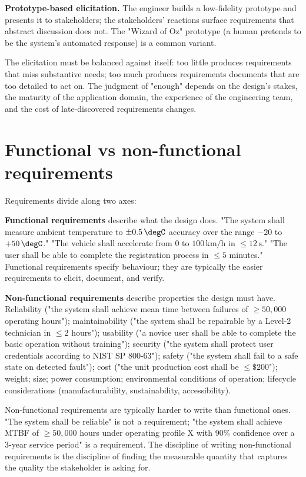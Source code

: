 \textbf{Prototype-based elicitation.} The engineer builds a low-fidelity prototype and presents it to stakeholders; the stakeholders' reactions surface requirements that abstract discussion does not. The "Wizard of Oz" prototype (a human pretends to be the system's automated response) is a common variant.

The elicitation must be balanced against itself: too little produces requirements that miss substantive needs; too much produces requirements documents that are too detailed to act on. The judgment of "enough" depends on the design's stakes, the maturity of the application domain, the experience of the engineering team, and the cost of late-discovered requirements changes.

\section{Functional vs non-functional requirements}

Requirements divide along two axes:

\textbf{Functional requirements} describe what the design does. "The system shall measure ambient temperature to $\pm 0.5\,\degC$ accuracy over the range $-20$ to $+50\,\degC$." "The vehicle shall accelerate from 0 to $100\,\text{km/h}$ in $\leq 12\,\text{s}$." "The user shall be able to complete the registration process in $\leq 5$ minutes." Functional requirements specify behaviour; they are typically the easier requirements to elicit, document, and verify.

\textbf{Non-functional requirements} describe properties the design must have. Reliability ("the system shall achieve mean time between failures of $\geq 50{,}000$ operating hours"); maintainability ("the system shall be repairable by a Level-2 technician in $\leq 2$ hours"); usability ("a novice user shall be able to complete the basic operation without training"); security ("the system shall protect user credentials according to NIST SP 800-63"); safety ("the system shall fail to a safe state on detected fault"); cost ("the unit production cost shall be $\leq \$200$"); weight; size; power consumption; environmental conditions of operation; lifecycle considerations (manufacturability, sustainability, accessibility).

Non-functional requirements are typically harder to write than functional ones. "The system shall be reliable" is not a requirement; "the system shall achieve MTBF of $\geq 50{,}000$ hours under operating profile X with 90\% confidence over a 3-year service period" is a requirement. The discipline of writing non-functional requirements is the discipline of finding the measurable quantity that captures the quality the stakeholder is asking for.


